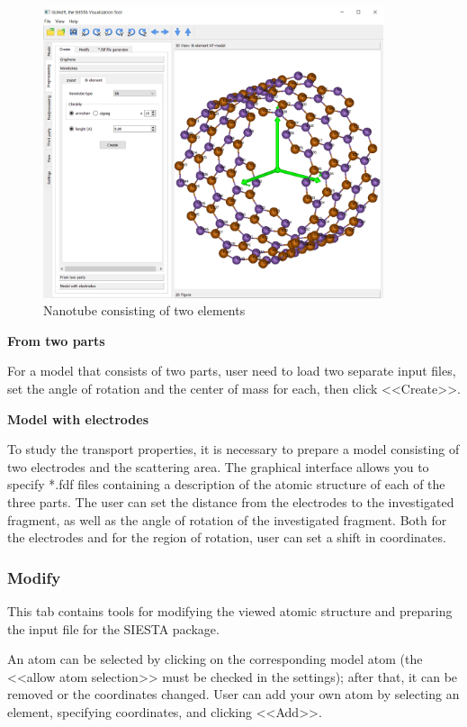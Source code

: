 \documentclass{article}
\begin{document}
\begin{figure}[h!]
	\centering
	\includegraphics[width=10.0cm]{create_bint}
	\caption{Nanotube consisting of two elements}
	\label{fig:create_bint}
\end{figure}

\textbf{From two parts}

For a model that consists of two parts, user need to load two separate input files, set the angle of rotation and the center of mass for each, then click <<Create>>.

\textbf{Model with electrodes}

To study the transport properties, it is necessary to prepare a model consisting of two electrodes and the scattering area. The graphical interface allows you to specify *.fdf files containing a description of the atomic structure of each of the three parts. The user can set the distance from the electrodes to the investigated fragment, as well as the angle of rotation of the investigated fragment. Both for the electrodes and for the region of rotation, user can set a shift in coordinates.

\subsubsection{Modify}

This tab contains tools for modifying the viewed atomic structure and preparing the input file for the SIESTA package.

An atom can be selected by clicking on the corresponding model atom (the <<allow atom selection>> must be checked in the settings); after that, it can be removed or the coordinates changed. User can add your own atom by selecting an element, specifying coordinates, and clicking <<Add>>.
\end{document}
